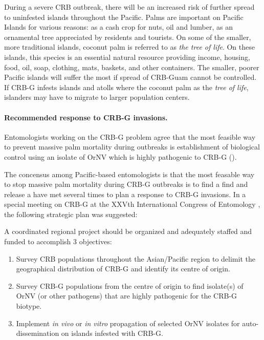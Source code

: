 \documentclass[12pt,letterpaper,english,bibliography=totocnumbered, abstract=on]{scrartcl}
\begin{document}
During a severe CRB outbreak, there will be an increased risk of further
spread to uninfested islands throughout the Pacific. Palms are important
on Pacific Islands for various reasons: as a cash crop for nuts, oil
and lumber, as an ornamental tree appreciated by residents and tourists.
On some of the smaller, more traditional islands, coconut palm
is referred to as \emph{the tree of life}. On these islands, this species is an
essential natural resource providing income, housing, food, oil, soap,
clothing, mats, baskets, and other containers. The smaller, poorer
Pacific islands will suffer the most if spread of CRB-Guam cannot
be controlled. If CRB-G infests islands and atolls where the coconut
palm as the \emph{tree of life}, islanders may have to migrate to
larger population centers.

\paragraph*{Recommended response to CRB-G invasions.}

Entomologists working on the CRB-G problem agree that the most feasible
way to prevent massive palm mortality during outbreaks is establishment
of biological control using an isolate of OrNV which is highly pathogenic
to CRB-G (\cite{jackson_need_2015,vaqalo_pest_2015,secretariat_of_the_pacific_community_pest_2017}).

The concensus among Pacific-based entomologists is that the most feasable
way to stop massive palm mortality during CRB-G outbreaks is to find
a find and release a have met several times to plan a response to
CRB-G invasions. In a special meeting on CRB-G at the XXVth International
Congress of Entomology 
, the following strategic
plan was suggested:

A coordinated regional project should be organized and adequately
staffed and funded to accomplish 3 objectives:

\begin{enumerate}
	
\item Survey CRB populations throughout the Asian/Pacific region to delimit
the geographical distribution of CRB-G and identify its centre of
origin.

\item Survey CRB-G populations from the centre of origin to find isolate(s)
of OrNV (or other pathogens) that are highly pathogenic for the CRB-G
biotype.

\item Implement \emph{in vivo} or \emph{in vitro} propagation of selected
OrNV isolates for auto-dissemination on islands infested with CRB-G.

\end{enumerate}
\end{document}
